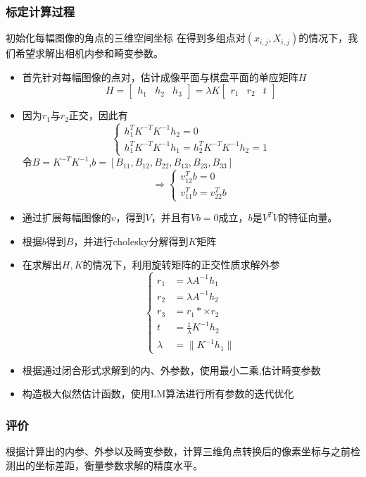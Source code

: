 \documentclass[UTF8]{ctexart}
\begin{document}
\begin{CJK*}{UTF8}{gbsn}
\subsubsection{标定计算过程}
初始化每幅图像的角点的三维空间坐标
在得到多组点对$(x_{i,j},X_{i,j})$的情况下，我们希望求解出相机内参和畸变参数。

\begin{itemize}
    \item 首先针对每幅图像的点对，估计成像平面与棋盘平面的单应矩阵$H$
     $$
      H =\left[\begin{array}{ccc}h_1&h_2&h_3 \end{array}\right]= \lambda K \left[\begin{array}{ccc}r_1&r_2&t \end{array}\right]
     $$
    \item 因为$r_1$与$r_2$正交，因此有
    $$
    \left\{
    \begin{array}{l}h_1^TK^{-T}K^{-1}h_2 = 0 \\ h_1^TK^{-T}K^{-1}h_1 = h_2^TK^{-T}K^{-1}h_2 = 1\end{array}
    \right. 
    $$
    令$B=K^{-T}K^{-1}$,$b=[B_{11},B_{12},B_{22},B_{13},B_{23},B_{33}]$
    $$
    \Rightarrow 
    \left\{ \begin{array}{l}v_{12}^Tb = 0 \\ v_{11}^Tb = v_{22}^Tb \end{array}\right.
    $$
    \item 通过扩展每幅图像的$v$，得到$V$，并且有$Vb=0$成立，$b$是$V^T V$的特征向量。
    \item 根据$b$得到$B$，并进行cholesky分解得到$K$矩阵
    \item 在求解出$H,K$的情况下，利用旋转矩阵的正交性质求解外参
    $$
    \left\{
    \begin{aligned}
        r_1&=\lambda A^{-1} h_1 \\
        r_2& = \lambda A^{-1} h_2 \\
        r_3 &=r_1*×r_2 \\
        t&=\frac{1}{\lambda} K^{-1} h_2 \\
        \lambda &= \|K^{-1}h_1\|
    \end{aligned}
    \right.
    $$
    \item 根据通过闭合形式求解到的内、外参数，使用最小二乘,估计畸变参数
    \item 构造极大似然估计函数，使用LM算法进行所有参数的迭代优化
\end{itemize}
\subsubsection{评价}
根据计算出的内参、外参以及畸变参数，计算三维角点转换后的像素坐标与之前检测出的坐标差距，衡量参数求解的精度水平。

\end{CJK*}
\end{document}
